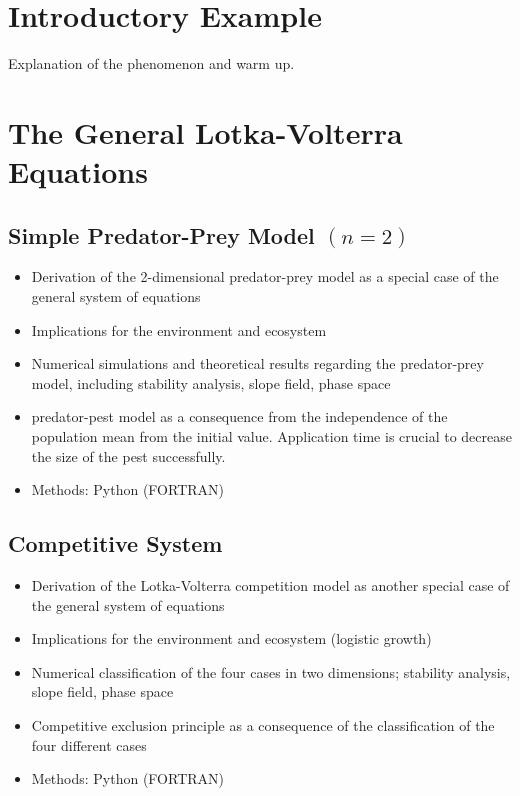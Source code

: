 \documentclass[12pt]{article}
\begin{document}
\section{Introductory Example}

Explanation of the phenomenon and warm up.

\section{The General Lotka-Volterra Equations}
\subsection{Simple Predator-Prey Model $(n = 2)$}

\begin{itemize}
    \item Derivation of the 2-dimensional predator-prey model as a special case of the general system of equations
    \item Implications for the environment and ecosystem
    \item Numerical simulations and theoretical results regarding the predator-prey model, including stability analysis, slope field, phase space
    \item predator-pest model as a consequence from the independence of the population mean from the initial value. Application time is crucial to decrease the size of the pest successfully.
    \item Methods: Python (FORTRAN)
\end{itemize}

\subsection{Competitive System}
\begin{itemize}
    \item Derivation of the Lotka-Volterra competition model as another special case of the general system of equations
    \item Implications for the environment and ecosystem (logistic growth)
    \item Numerical classification of the four cases in two dimensions; stability analysis, slope field, phase space
    \item Competitive exclusion principle as a consequence of the classification of the four different cases
    \item Methods: Python (FORTRAN)
\end{itemize}
\end{document}
